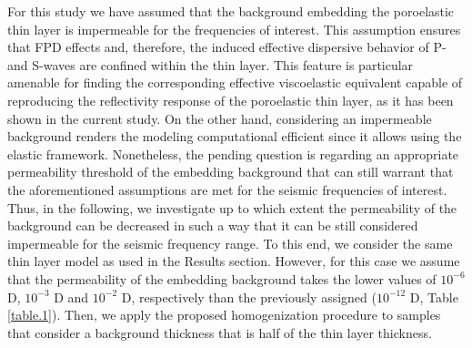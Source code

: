 \documentclass[draft]{agujournal2019}
\begin{document}
For this study we have assumed that the background embedding the poroelastic thin layer is impermeable for the frequencies of interest. This assumption ensures that FPD effects and, therefore, the induced effective dispersive behavior of P-and S-waves are confined within the thin layer. This feature is particular amenable for finding the corresponding effective viscoelastic equivalent capable of reproducing the reflectivity response of the poroelastic thin layer, as it has been shown in the current study. On the other hand, considering an impermeable background renders the modeling computational efficient since it allows using the elastic framework. Nonetheless, the pending question is regarding an appropriate permeability threshold of the embedding background that can still warrant that the aforementioned assumptions are met for the seismic frequencies of interest. Thus, in the following, we investigate up to which extent the permeability of the background can be decreased in such a way that it can be still considered impermeable for the seismic frequency range.
To this end, we consider the same thin layer model as used in the Results section. However, for this case we assume that the permeability of the embedding background takes the lower values of $10^{-6}$ D, $10^{-3}$ D and $10^{-2}$ D, respectively than the previously assigned ($10^{-12}$ D, Table \ref{table.1}). Then, we apply the proposed homogenization procedure to samples that consider a background thickness that is half of the thin layer thickness. 
\end{document}
